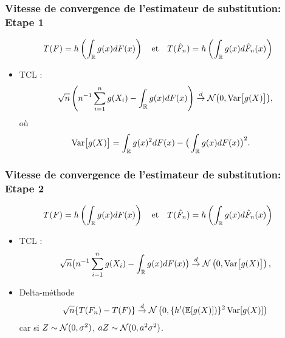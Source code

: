 \begin{frame}
\frametitle{Vitesse de convergence de l'estimateur de substitution: Etape 1}
\[
T(F)= h \left( \int_{\mathbb{R}} g(x) dF(x) \right) \quad \text{et} \quad T(\hat{F}_n)= h \left( \int_{\mathbb{R}} g(x) d \hat{F}_n(x) \right)
\]
\begin{itemize}
\item \alert{TCL} :
$$\sqrt{n}\left(n^{-1}\sum_{i=1}^ng(X_i)-\int_{\operatorname{{\mathbb R}}}g(x)dF(x)\right) \stackrel{d}{\rightarrow} {\mathcal N}\big(0,\mathrm{Var}\big[g(X)\big]\big),$$
où 
\begin{align*}
\text{Var}\big[g(X)\big]  &= \int_{\operatorname{{\mathbb R}}}g(x)^2dF(x)-\big(\int_{\operatorname{{\mathbb R}}}g(x)dF(x)\big)^2.
\end{align*}
\end{itemize}
\end{frame}

\begin{frame}
\frametitle{Vitesse de convergence de l'estimateur de substitution: Etape 2}
\[
T(F)= h \left( \int_{\mathbb{R}} g(x) dF(x) \right) \quad \text{et} \quad T(\hat{F}_n)= h \left( \int_{\mathbb{R}} g(x) d \hat{F}_n(x) \right)
\]
\begin{itemize}
\item \alert{TCL} :
$$\sqrt{n}\big(n^{-1}\sum_{i=1}^ng(X_i)-\int_{\operatorname{{\mathbb R}}}g(x)dF(x)\big) \stackrel{d}{\rightarrow} \mathcal{N}\left(0,\mathrm{Var}\big[g(X)\big]\right),$$
\item \alert{Delta-méthode}
\[
\sqrt{n} \{ T(F_n) - T(F) \} \stackrel{d}{\rightarrow} \mathcal{N}\left(0, \{ h'(\operatorname{{\mathbb E}}[g(X)]) \}^2 \operatorname{\mathrm{Var}}[ g(X) ] \right)
\]
car si $Z \sim \mathcal{N}(0,\sigma^2)$, $a Z \sim \mathcal{N}(0, a^2 \sigma^2)$.
\end{itemize}
\end{frame}


